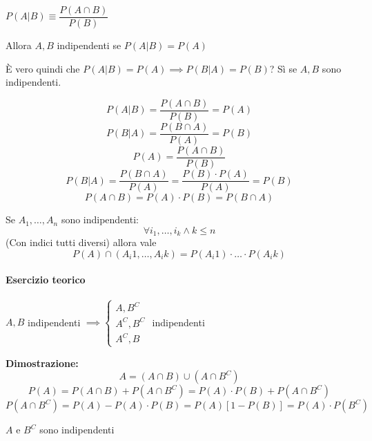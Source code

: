 $ P(A|B) \equiv \dfrac{P(A \cap B)}{P(B)} $ 

Allora $ A,B $ indipendenti se $ P(A|B) = P(A) $

È vero quindi che $ P(A|B) = P(A) \implies P(B|A) = P(B) $? Sì se $ A,B $ sono indipendenti.

\[ P(A|B) = \dfrac{P(A \cap B)}{P(B)} = P(A) \]
\[ P(B|A) = \dfrac{P(B \cap A)}{P(A)} = P(B) \]
\[ P(A) = \dfrac{P(A \cap B)}{P(B)} \]
\[ P(B|A) = \dfrac{P(B \cap A)}{P(A)} = \dfrac{P(B) \cdot P(A)}{P(A)} = P(B)\]
\[ P(A \cap B)  = P(A) \cdot P(B) = P(B \cap A) \]

Se $ A_1, \dots, A_n $ sono indipendenti:
\[ \forall i_1, \dots, i_k \land k \leq n \] (Con indici tutti diversi) allora vale \[ P(A)\cap \left(A_i1,\dots,A_ik\right) = P(A_i1) \cdot \dots \cdot P(A_ik) \] 

\paragraph{Esercizio teorico}

$ A, B $ indipendenti $ \implies \begin{cases}
A, B^C \\
A^C, B^C \\
A^C, B
\end{cases} $ indipendenti

\textbf{Dimostrazione:}
\[ A = (A \cap B) \cup (A \cap B^C)  \]
\[ P(A) = P(A \cap B) + P(A \cap B^C) = P(A) \cdot P(B) + P(A \cap B^C) \]
\[ P(A \cap B^C) = P(A) - P(A) \cdot P(B) = P(A)\left[1 - P(B)\right] = P(A) \cdot P(B^C) \]

$ A $ e $ B^C $ sono indipendenti \enddim